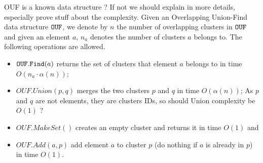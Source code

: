 \vspace{0.3cm}

{\color{red}
OUF is a known data structure ?
If not we should explain in more details,
especially prove stuff about the complexity.
}
 Given an Overlapping Union-Find data structure $\tt OUF$, we denote by $n$ the number of overlapping clusters in $\tt OUF$ and given an element 
$a$, $n_a$ denotes the number of clusters $a$ belongs to. 
The following operations are allowed.
\begin{itemize}
\item ${\tt OUF.Find}(a)$ returns the set of clusters that element $a$ belongs to in time $O(n_a\cdot\alpha(n))$;
\item $OUF.Union(p,q)$ merges the two clusters $p$ and $q$ in time $O(\alpha(n))$;
{\color{red} As $p$ and $q$ are not
elements, they are clusters IDs, so
should Union complexity be $O(1)$ ? }


\item $OUF.MakeSet()$ creates an empty cluster and returns it in time $O(1)$ and
\item $OUF.Add(a,p)$ add element $a$ to cluster $p$ (do nothing if $a$ is already in $p$) in time $O(1)$.
\end{itemize}


